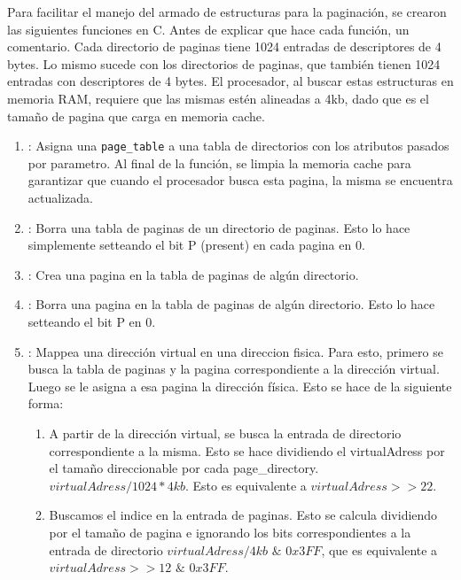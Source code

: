 Para facilitar el manejo del armado de estructuras para la paginación, se crearon las siguientes funciones en C. Antes de explicar que hace cada función, un comentario. Cada directorio de paginas tiene 1024 entradas de descriptores de 4 bytes. Lo mismo sucede con los directorios de paginas, que también tienen 1024 entradas con descriptores de 4 bytes. El procesador, al buscar estas estructuras en memoria RAM, requiere que las mismas estén alineadas a 4kb, dado que es el tamaño de pagina que carga en memoria cache.

\begin{enumerate}
\item {}: Asigna una \texttt{page\_table} a una tabla de directorios con los atributos pasados por parametro. Al final de la función, se limpia la memoria cache para garantizar que cuando el procesador busca esta pagina, la misma se encuentra actualizada.

\item {}: Borra una tabla de paginas de un directorio de paginas. Esto lo hace simplemente setteando el bit P (present) en cada pagina en 0.

\item {}: Crea una pagina en la tabla de paginas de algún directorio.

\item {}: Borra una pagina en la tabla de paginas de algún directorio. Esto lo hace setteando el bit P en 0.

\item {}: Mappea una dirección virtual en una direccion fisica. Para esto, primero se busca la tabla de paginas y la pagina correspondiente a la dirección virtual. Luego se le asigna a esa pagina la dirección física. Esto se hace de la siguiente forma:
	\begin{enumerate}
	\item A partir de la dirección virtual, se busca la entrada de directorio correspondiente a la misma. Esto se hace dividiendo el virtualAdress por el tamaño direccionable por cada page\_directory.$virtualAdress / 1024*4kb$. Esto es equivalente a $virtualAdress >> 22$.
	\item Buscamos el indice en la entrada de paginas. Esto se calcula dividiendo por el tamaño de pagina e ignorando los bits correspondientes a la entrada de directorio $virtualAdress / 4kb$ $\&$ $0x3FF$, que es equivalente a $virtualAdress >> 12$ $\&$ $0x3FF$.
	\end{enumerate}


\end{enumerate}
